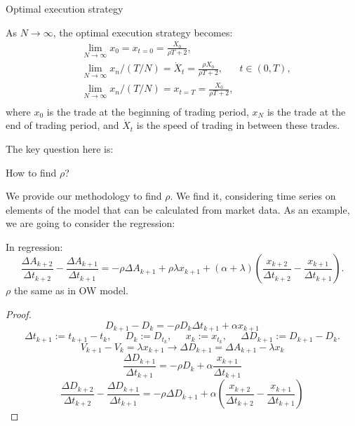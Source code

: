 \documentclass[]{beamer}
\begin{document}
\begin{frame}[t]
\begin{columns}[t]
\begin{column}{\onecolwid}
\begin{block}{Optimal execution strategy }
    \begin{theorem}
        As $N \rightarrow \infty$, the optimal execution strategy becomes:
        \begin{align*}
            & \lim _{N \rightarrow \infty} x_0 = x_{t = 0} = \frac{X_0}{\rho T + 2}, \\
            & \lim _{N \rightarrow \infty} x_n / (T/N) = \dot X _t = \frac{\rho X_0}{\rho T + 2}, \;\;\;\;\;\; t \in (0, T), \\
            & \lim _{N \rightarrow \infty} x_n / (T/N) = x_{t=T}=  \frac{X_0}{\rho T + 2},  \\
        \end{align*}
        where $x_0$ is the trade at the beginning of trading period, $x_N$ is the trade at the end of trading
        period, and $\dot X _t$ is the speed of trading in between these trades.
    \end{theorem}
    The key question here is:
    \end{block}

    \begin{block}{How to find $\rho$?}
        
        We provide our methodology to find $\rho$. We find it, considering time series on elements of the model 
        that can be calculated from market data. As an example, we are going to consider the regression:
        \begin{theorem}
            In regression:
            \begin{equation*}
                \frac{\Delta A_{k+2}}{\Delta t_{k+2}} - \frac{\Delta A_{k+1}}{\Delta t_{k+1}} 
        = - \rho \Delta A_{k+1} + \rho \lambda x_{k+1} + (\alpha + \lambda) (\frac{x_{k+2}}{\Delta t_{k+2}} - \frac{x_{k+1}}{\Delta t_{k+1}}).
            \end{equation*}
            $\rho$ the same as in OW model.
        \end{theorem}
        \begin{proof}
            \[ D_{k+1} - D_k = -\rho D_k \Delta t_{k+1} + \alpha x_{k+1} \]
            \[ \Delta t_{k+1} := t_{k+1} - t_k, \; \; \; \; \; D_k := D_{t_k}, \; \; \; \; \; x_{k}:= x_{t_k}, \; \; \; \; \; \Delta D_{k+1} := D_{k+1} - D_k . \]
            \[ V_{k+1} - V_k = \lambda x_{k+1} \rightarrow \Delta D_{k+1} = \Delta A_{k+1} - \lambda x_k \] 
            \[ \frac{\Delta D_{k+1}}{\Delta t_{k+1}} = - \rho D_k + \alpha \frac{x_{k+1}}{\Delta t_{k+1}} \] 
            \[ \frac{\Delta D_{k+2}}{\Delta t_{k+2}} - \frac{\Delta D_{k+1}}{\Delta t_{k+1}} 
                = - \rho \Delta D_{k+1} + \alpha ( \frac{x_{k+2}}{\Delta t_{k+2}} - \frac{x_{k+1}}{\Delta t_{k+1}}) \] 
        \end{proof}
    \end{block}


\end{column}
\end{columns}
\end{frame}
\end{document}
